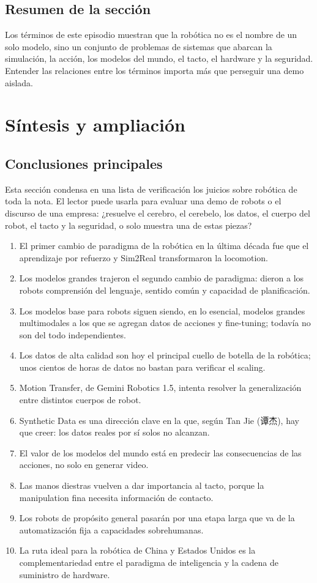 \documentclass[a4paper]{article}
\begin{document}
\subsection{Resumen de la sección}

Los términos de este episodio muestran que la robótica no es el nombre de un solo modelo, sino un conjunto de problemas de sistemas que abarcan la simulación, la acción, los modelos del mundo, el tacto, el hardware y la seguridad. Entender las relaciones entre los términos importa más que perseguir una demo aislada.
\section{Síntesis y ampliación}

\subsection{Conclusiones principales}

Esta sección condensa en una lista de verificación los juicios sobre robótica de toda la nota. El lector puede usarla para evaluar una demo de robots o el discurso de una empresa: ¿resuelve el cerebro, el cerebelo, los datos, el cuerpo del robot, el tacto y la seguridad, o solo muestra una de estas piezas?

\begin{enumerate}
\item El primer cambio de paradigma de la robótica en la última década fue que el aprendizaje por refuerzo y Sim2Real transformaron la locomotion.
\item Los modelos grandes trajeron el segundo cambio de paradigma: dieron a los robots comprensión del lenguaje, sentido común y capacidad de planificación.
\item Los modelos base para robots siguen siendo, en lo esencial, modelos grandes multimodales a los que se agregan datos de acciones y fine-tuning; todavía no son del todo independientes.
\item Los datos de alta calidad son hoy el principal cuello de botella de la robótica; unos cientos de horas de datos no bastan para verificar el scaling.
\item Motion Transfer, de Gemini Robotics 1.5, intenta resolver la generalización entre distintos cuerpos de robot.
\item Synthetic Data es una dirección clave en la que, según Tan Jie (谭杰), hay que creer: los datos reales por sí solos no alcanzan.
\item El valor de los modelos del mundo está en predecir las consecuencias de las acciones, no solo en generar video.
\item Las manos diestras vuelven a dar importancia al tacto, porque la manipulation fina necesita información de contacto.
\item Los robots de propósito general pasarán por una etapa larga que va de la automatización fija a capacidades sobrehumanas.
\item La ruta ideal para la robótica de China y Estados Unidos es la complementariedad entre el paradigma de inteligencia y la cadena de suministro de hardware.
\end{enumerate}
\end{document}
